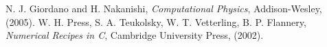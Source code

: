 \documentclass{article}
\begin{document}
\begin{thebibliography}{2}
	N. J. Giordano and H. Nakanishi, \textit{Computational Physics}, Addison-Wesley, (2005).
	W. H. Press, S. A. Teukolsky, W. T. Vetterling, B. P. Flannery, \textit{Numerical Recipes in C}, Cambridge University Press, (2002).
\end{thebibliography}
\end{document}
